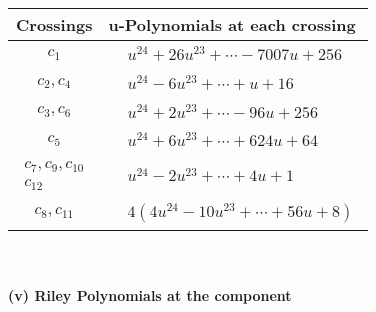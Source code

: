\documentclass[1p]{elsarticle_modified}
\theoremstyle{definition}
\begin{document}
\begin{tabular}{m{50pt}|m{274pt}}
Crossings & \hspace{64pt}u-Polynomials at each crossing \\
\hline $$\begin{aligned}c_{1}\end{aligned}$$&$\begin{aligned}
&u^{24}+26 u^{23}+\cdots-7007 u+256
\end{aligned}$\\
\hline $$\begin{aligned}c_{2},c_{4}\end{aligned}$$&$\begin{aligned}
&u^{24}-6 u^{23}+\cdots+u+16
\end{aligned}$\\
\hline $$\begin{aligned}c_{3},c_{6}\end{aligned}$$&$\begin{aligned}
&u^{24}+2 u^{23}+\cdots-96 u+256
\end{aligned}$\\
\hline $$\begin{aligned}c_{5}\end{aligned}$$&$\begin{aligned}
&u^{24}+6 u^{23}+\cdots+624 u+64
\end{aligned}$\\
\hline $$\begin{aligned}c_{7},c_{9},c_{10}\\c_{12}\end{aligned}$$&$\begin{aligned}
&u^{24}-2 u^{23}+\cdots+4 u+1
\end{aligned}$\\
\hline $$\begin{aligned}c_{8},c_{11}\end{aligned}$$&$\begin{aligned}
&4(4 u^{24}-10 u^{23}+\cdots+56 u+8)
\end{aligned}$\\
\hline
\end{tabular}\\~\\
\newpage\renewcommand{\arraystretch}{1}
\flushleft \textbf{(v) Riley Polynomials at the component}\newline \\
\end{document}
